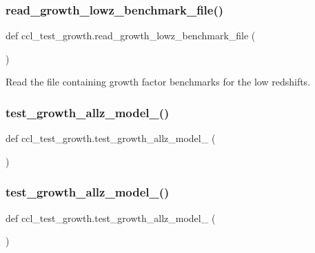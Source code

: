 \subsubsection{\texorpdfstring{read\+\_\+growth\+\_\+lowz\+\_\+benchmark\+\_\+file()}{read\_growth\_lowz\_benchmark\_file()}}
{\footnotesize\ttfamily def ccl\+\_\+test\+\_\+growth.\+read\+\_\+growth\+\_\+lowz\+\_\+benchmark\+\_\+file (\begin{DoxyParamCaption}{ }\end{DoxyParamCaption})}

\begin{DoxyVerb}Read the file containing growth factor benchmarks for the low redshifts.
\end{DoxyVerb}
 \mbox{\label{namespaceccl__test__growth_abc7a6f255bc64edc4b8af6e8e98914f1}} 
\subsubsection{\texorpdfstring{test\+\_\+growth\+\_\+allz\+\_\+model\+\_()}{test\_growth\_allz\_model\_0()}}
{\footnotesize\ttfamily def ccl\+\_\+test\+\_\+growth.\+test\+\_\+growth\+\_\+allz\+\_\+model\+\_ (\begin{DoxyParamCaption}{ }\end{DoxyParamCaption})}

\mbox{\label{namespaceccl__test__growth_a5d87ba3e86e28bed7f6916eb7ca3f54d}} 
\subsubsection{\texorpdfstring{test\+\_\+growth\+\_\+allz\+\_\+model\+\_()}{test\_growth\_allz\_model\_1()}}
{\footnotesize\ttfamily def ccl\+\_\+test\+\_\+growth.\+test\+\_\+growth\+\_\+allz\+\_\+model\+\_ (\begin{DoxyParamCaption}{ }\end{DoxyParamCaption})}

